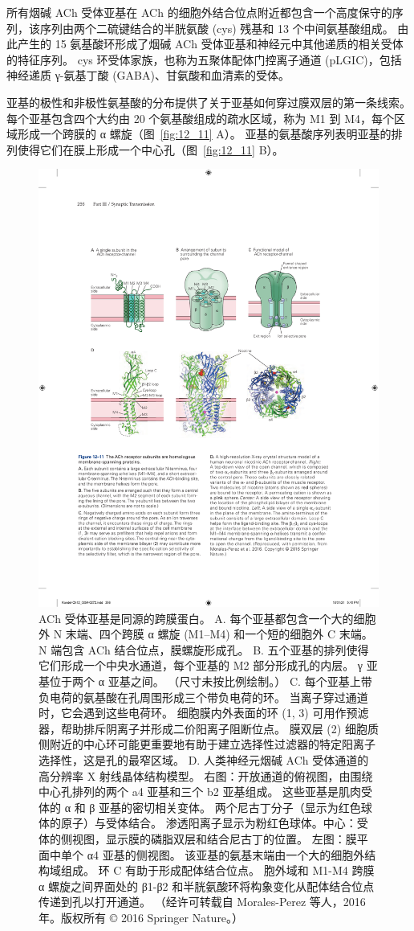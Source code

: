 所有烟碱 ACh 受体亚基在 ACh 的细胞外结合位点附近都包含一个高度保守的序列，该序列由两个二硫键结合的半胱氨酸 (cys) 残基和 13 个中间氨基酸组成。
由此产生的 15 氨基酸环形成了烟碱 ACh 受体亚基和神经元中其他递质的相关受体的特征序列。
cys 环受体家族，也称为五聚体配体门控离子通道 (pLGIC)，包括神经递质 γ-氨基丁酸 (GABA)、甘氨酸和血清素的受体。


亚基的极性和非极性氨基酸的分布提供了关于亚基如何穿过膜双层的第一条线索。
每个亚基包含四个大约由 20 个氨基酸组成的疏水区域，称为 M1 到 M4，每个区域形成一个跨膜的 α 螺旋（图~\ref{fig:12_11} A）。
亚基的氨基酸序列表明亚基的排列使得它们在膜上形成一个中心孔（图~\ref{fig:12_11} B）。


\begin{figure}[htbp]
	\centering
	\includegraphics[width=0.85\linewidth]{chap12/fig_12_11}
	\caption{ACh 受体亚基是同源的跨膜蛋白。 A. 每个亚基都包含一个大的细胞外 N 末端、四个跨膜 α 螺旋 (M1–M4) 和一个短的细胞外 C 末端。 N 端包含 ACh 结合位点，膜螺旋形成孔。 B. 五个亚基的排列使得它们形成一个中央水通道，每个亚基的 M2 部分形成孔的内层。 γ 亚基位于两个 α 亚基之间。 （尺寸未按比例绘制。） C. 每个亚基上带负电荷的氨基酸在孔周围形成三个带负电荷的环。 当离子穿过通道时，它会遇到这些电荷环。 细胞膜内外表面的环 (1, 3) 可用作预滤器，帮助排斥阴离子并形成二价阳离子阻断位点。 膜双层 (2) 细胞质侧附近的中心环可能更重要地有助于建立选择性过滤器的特定阳离子选择性，这是孔的最窄区域。 D. 人类神经元烟碱 ACh 受体通道的高分辨率 X 射线晶体结构模型。 右图：开放通道的俯视图，由围绕中心孔排列的两个 a4 亚基和三个 b2 亚基组成。 这些亚基是肌肉受体的 α 和 β 亚基的密切相关变体。 两个尼古丁分子（显示为红色球体的原子）与受体结合。 渗透阳离子显示为粉红色球体。中心：受体的侧视图，显示膜的磷脂双层和结合尼古丁的位置。 左图：膜平面中单个 α4 亚基的侧视图。 该亚基的氨基末端由一个大的细胞外结构域组成。 环 C 有助于形成配体结合位点。 胞外域和 M1-M4 跨膜 α 螺旋之间界面处的 β1-β2 和半胱氨酸环将构象变化从配体结合位点传递到孔以打开通道。 （经许可转载自 Morales-Perez 等人，2016 年。版权所有 © 2016 Springer Nature。）}

\end{figure}
